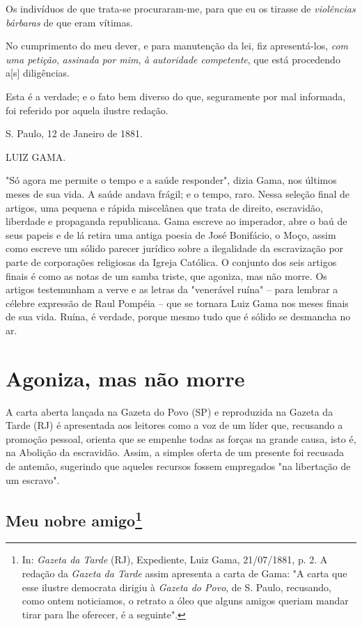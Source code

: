 {Os indivíduos de que trata-se procuraram-me, para que eu os tirasse de
\emph{violências bárbaras} de que eram vítimas.

No cumprimento do meu dever, e para manutenção da lei, fiz
apresentá-los, \emph{com uma petição}, \emph{assinada por mim}, \emph{à}
\emph{autoridade competente}, que está procedendo a{[}s{]} diligências.

Esta é a verdade; e o fato bem diverso do que, seguramente por mal
informada, foi referido por aquela ilustre redação.

S. Paulo, 12 de Janeiro de 1881.

LUIZ GAMA.

\pagebreak
\mbox{}\vfill
\thispagestyle{empty}

{\small\noindent
"Só agora me permite o tempo e a saúde responder", dizia Gama, nos
últimos meses de sua vida. A saúde andava frágil; e o tempo, raro. Nessa
seleção final de artigos, uma pequena e rápida miscelânea que trata de
direito, escravidão, liberdade e propaganda republicana. Gama escreve ao
imperador, abre o baú de seus papeis e de lá retira uma antiga poesia de
José Bonifácio, o Moço, assim como escreve um sólido parecer jurídico
sobre a ilegalidade da escravização por parte de corporações religiosas
da Igreja Católica. O conjunto dos seis artigos finais é como as notas
de um samba triste, que agoniza, mas não morre. Os artigos testemunham a
verve e as letras da "venerável ruína" -- para lembrar a célebre
expressão de Raul Pompéia -- que se tornara Luiz Gama nos meses finais
de sua vida. Ruína, é verdade, porque mesmo tudo que é sólido se
desmancha no ar.}

\part{Agoniza, mas não morre}

\pagebreak
\mbox{}\vfill
\thispagestyle{empty}

{\small\noindent
A carta aberta lançada na Gazeta do Povo (SP) e reproduzida na
Gazeta da Tarde (RJ) é apresentada aos leitores como a voz de um líder
que, recusando a promoção pessoal, orienta que se empenhe todas as
forças na grande causa, isto é, na Abolição da escravidão. Assim, a
simples oferta de um presente foi recusada de antemão, sugerindo que
aqueles recursos fossem empregados "na libertação de um escravo". }

\chapter{Meu nobre amigo\footnote[*]{In: \emph{Gazeta da Tarde} (RJ),
  Expediente, Luiz Gama, 21/07/1881, p. 2. A redação da \emph{Gazeta da
  Tarde} assim apresenta a carta de Gama: "A carta que esse ilustre
  democrata dirigiu à \emph{Gazeta do Povo}, de S. Paulo, recusando,
  como ontem noticiamos, o retrato a óleo que alguns amigos queriam
  mandar tirar para lhe oferecer, é a seguinte".}}


}

